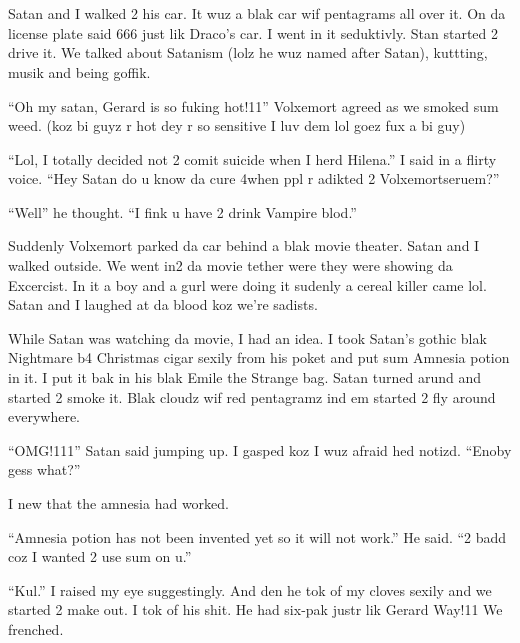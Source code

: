 \section{\chaptername~\thesection}



Satan and I walked 2 his car. It wuz a blak car wif pentagrams all over it. On da license plate said 666 just lik Draco's car. I went in it seduktivly. Stan started 2 drive it. We talked about Satanism (lolz he wuz named after Satan), kuttting, musik and being goffik.

\enquote{Oh my satan, Gerard is so fuking hot!11} Volxemort agreed as we smoked sum weed. (koz bi guyz r hot dey r so sensitive I luv dem lol goez fux a bi guy)

\enquote{Lol, I totally decided not 2 comit suicide when I herd Hilena.} I said in a flirty voice. \enquote{\dotfill Hey Satan do u know da cure 4\newline when ppl r adikted 2 Volxemortseruem?}

\enquote{Well\dotfill} he thought. \enquote{I fink u have 2 drink Vampire blod.}

Suddenly Volxemort parked da car behind a blak movie theater. Satan and I walked outside. We went in2 da movie tether were they were showing da Excercist. In it a boy and a gurl were doing it sudenly a cereal killer came lol. Satan and I laughed at da blood koz we're sadists.

While Satan was watching da movie, I had an idea. I took Satan's gothic blak Nightmare b4 Christmas cigar sexily from his poket and put sum Amnesia potion in it. I put it bak in his blak Emile the Strange bag. Satan turned arund and started 2 smoke it. Blak cloudz wif red pentagramz ind em started 2 fly around everywhere.

\enquote{OMG!111} Satan said jumping up. I gasped koz I wuz afraid hed notizd. \enquote{Enoby gess what?}

I new that the amnesia had worked.

\enquote{Amnesia potion has not been invented yet so it will not work.} He said. \enquote{2 badd coz I wanted 2 use sum on u.}

\enquote{Kul.} I raised my eye suggestingly. And den\dotfill\newline
he tok of my cloves sexily and we started 2 make out. I tok of his shit. He had six-pak justr lik Gerard Way!11 We frenched.

